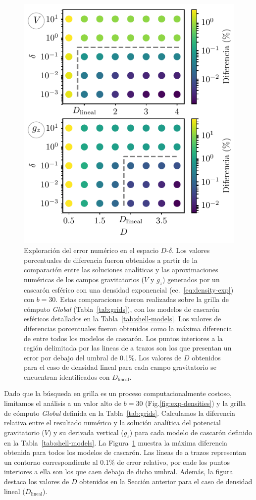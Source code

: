 \begin{figure}[!t]
\centering
\includegraphics[width=0.5\linewidth]{figs/tesseroids-variable-density/grid-search.pdf}
\caption{
    Exploración del error numérico en el espacio $D$-$\delta$.
    Los valores porcentuales de diferencia fueron obtenidos a partir de la
    comparación entre las soluciones analíticas y las aproximaciones numéricas
    de los campos gravitatorios ($V$ y $g_z$) generados por un cascarón
    esférico con una densidad exponencial
    (ec.~\ref{eq:density-exp}) con $b=30$.
    Estas comparaciones fueron realizadas sobre la grilla de cómputo
    \emph{Global} (Tabla~\ref{tab:grids}), con los modelos de cascarón
    esféricos detallados en la Tabla~\ref{tab:shell-models}.
    Los valores de diferencias porcentuales fueron obtenidos como la máxima
    diferencia de entre todos los modelos de cascarón.
    Los puntos interiores a la región delimitada por las lineas de a trazos son
    los que presentan un error por debajo del umbral de 0.1\%.
    Los valores de $D$ obtenidos para el caso de densidad lineal para cada
    campo gravitatorio se encuentran identificados con $D_\text{lineal}$.
    }
\label{fig:grid-search}
\end{figure}

Dado que la búsqueda en grilla es un proceso computacionalmente costoso,
limitamos el análisis a un valor alto de $b=30$ (Fig.\ref{fig:exp-densities})
y la grilla de cómputo \emph{Global} definida en la Tabla~\ref{tab:grids}.
Calculamos la diferencia relativa entre el resultado numérico y la solución
analítica del potencial gravitatorio ($V$) y su derivada vertical ($g_z$) para
cada modelo de cascarón definido en la Tabla~\ref{tab:shell-models}.
La Figura~\ref{fig:grid-search} muestra la máxima diferencia obtenida para
todos los modelos de cascarón.
Las líneas de a trazos representan un contorno correspondiente al 0.1\% de
error relativo, por ende los puntos interiores a ella son los que caen debajo
de dicho umbral.
Además, la figura destaca los valores de $D$ obtenidos en la Sección anterior
para el caso de densidad lineal ($D_\text{lineal}$).

